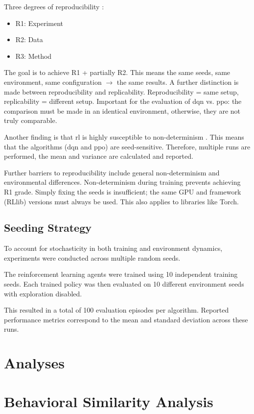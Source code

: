 \documentclass[english,bachelor]{hsluthesis}
\begin{document}
Three degrees of reproducibility \cite{Gundersen_Kjensmo_2018}:
\begin{itemize}
    \item R1: Experiment
    \item R2: Data
    \item R3: Method
\end{itemize}
The goal is to achieve R1 + partially R2. This means the same seeds, same environment, same configuration $\to$ the same results.
A further distinction is made between reproducibility and replicability. Reproducibility = same setup, replicability = different setup. Important for the evaluation of \gls{dqn} vs. \gls{ppo}: the comparison must be made in an identical environment, otherwise, they are not truly comparable.

Another finding is that \gls{rl} is highly susceptible to non-determinism \cite{Nagarajan2018TheIO}. This means that the algorithms (\gls{dqn} and \gls{ppo}) are seed-sensitive. Therefore, multiple runs are performed, the mean and variance are calculated and reported.

Further barriers to reproducibility include general non-determinism and environmental differences. Non-determinism during training prevents achieving R1 grade. Simply fixing the seeds is insufficient; the same GPU and framework (RLlib) versions must always be used. This also applies to libraries like Torch.

\subsection{Seeding Strategy}
To account for stochasticity in both training and environment dynamics, experiments were conducted across multiple random seeds.

The reinforcement learning agents were trained using 10 independent training seeds. Each trained policy was then evaluated on 10 different environment seeds with exploration disabled.

This resulted in a total of 100 evaluation episodes per algorithm. Reported performance metrics correspond to the mean and standard deviation across these runs.

\section{Analyses}

\section{Behavioral Similarity Analysis}
\end{document}
